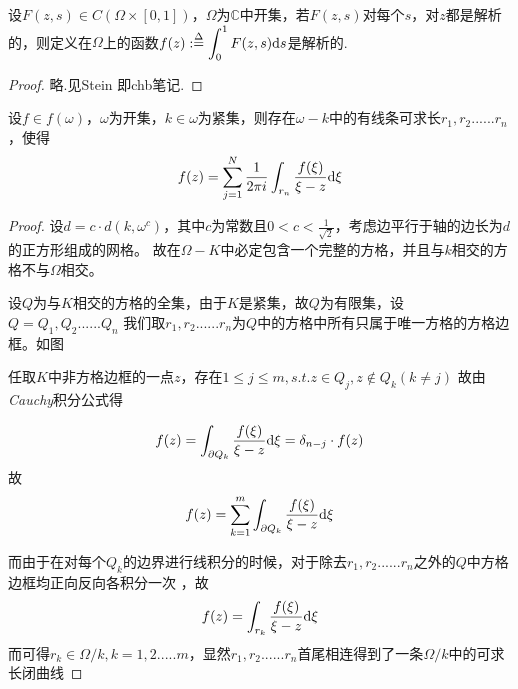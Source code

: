 \begin{mypro}
	设$\displaystyle{F(z, s) \in C(\Omega \times [0,1]) }$，$\displaystyle{\Omega}$为$\displaystyle{\mathbb{C}}$中开集，若$\displaystyle{F(z,s)}$对每个$\displaystyle{s}$，对$\displaystyle{z}$都是解析的，则定义在$\displaystyle{\Omega}$上的函数$\displaystyle{f(z):\overset{\Delta}{=} \int_0^1 F(z,s) \mathrm{d}s}$是解析的.
\end{mypro}
\begin{proof}
	略.见{\rm Stein} 即chb笔记.
\end{proof}

\begin{mypro}
	设$f \in f(\omega)$，$\omega$为开集，$k\in\omega$为紧集，则存在$\omega-k$中的有线条可求长$r_{1},r_{2}......r_{n}$，使得
	\begin{equation*}
	f(z)=\sum_{j=1}^{N}\frac{1}{2\pi i}\int_{r_{n}}\frac{f(\xi)}{\xi-z}\mathrm{d}\xi
	\end{equation*}
\end{mypro}
\begin{proof}
	设$d=c \cdot d(k,\omega^{c})$，其中$c$为常数且$0<c<\frac{1}{\sqrt{2}}$，考虑边平行于轴的边长为$d$的正方形组成的网格。
	故在$\Omega-K$中必定包含一个完整的方格，并且与$k$相交的方格不与$\Omega$相交。
	
	设$Q$为与$K$相交的方格的全集，由于$K$是紧集，故$Q$为有限集，设$Q={Q_{1},Q_{2}......Q_{n}}$
	我们取$r_{1},r_{2}......r_{n}$为$Q$中的方格中所有只属于唯一方格的方格边框。如图
	
	任取$K$中非方格边框的一点$z$，存在$1 \le j \le m , s.t.  z \in Q_{j},z\notin Q_{k} (k \ne j)$
	故由\emph{Cauchy}积分公式得
	
	\begin{equation*}
	f(z)=\int_{\partial Q_{k}}\frac{f(\xi)}{\xi - z}\mathrm{d}\xi=\delta_{n-j}\cdot f(z)
	\end{equation*}
	故
	\begin{equation*}
	f(z)=\sum_{k=1}^{m}\int_{\partial Q_{k}}\frac{f(\xi)}{\xi -z}\mathrm{d}\xi
	\end{equation*}
	
	而由于在对每个$Q_{k}$的边界进行线积分的时候，对于除去$r_{1},r_{2}......r_{n}$之外的$Q$中方格边框均正向反向各积分一次
	，故
	\begin{equation*}
	f(z)=\int_{r_{k}}\dfrac{f(\xi)}{\xi - z}\mathrm{d}\xi
	\end{equation*}
	而可得$r_{k} \in \Omega /k,k=1,2.....m$，显然$r_{1},r_{2}......r_{n}$首尾相连得到了一条$\Omega /k$中的可求长闭曲线        
\end{proof}

